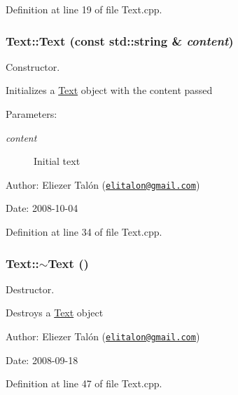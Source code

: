 Definition at line 19 of file Text.cpp.\hypertarget{class_text_d8c7b52db022f4351e31b2b7609a8180}{
\subsubsection[Text]{\setlength{\rightskip}{0pt plus 5cm}Text::Text (const std::string \& {\em content})}}
\label{class_text_d8c7b52db022f4351e31b2b7609a8180}


Constructor. 

Initializes a \hyperlink{class_text}{Text} object with the content passed

\begin{Desc}
\item[Parameters:]
\begin{description}
\item[{\em content}]Initial text\end{description}
\end{Desc}
\begin{Desc}
\item[Author:]Eliezer Talón (\href{mailto:elitalon@gmail.com}{\tt elitalon@gmail.com}) \end{Desc}
\begin{Desc}
\item[Date:]2008-10-04 \end{Desc}


Definition at line 34 of file Text.cpp.\hypertarget{class_text_2d49e5c280e205125b149f7777ae30c7}{
\subsubsection[$\sim$Text]{\setlength{\rightskip}{0pt plus 5cm}Text::$\sim$Text ()}}
\label{class_text_2d49e5c280e205125b149f7777ae30c7}


Destructor. 

Destroys a \hyperlink{class_text}{Text} object

\begin{Desc}
\item[Author:]Eliezer Talón (\href{mailto:elitalon@gmail.com}{\tt elitalon@gmail.com}) \end{Desc}
\begin{Desc}
\item[Date:]2008-09-18 \end{Desc}


Definition at line 47 of file Text.cpp.

